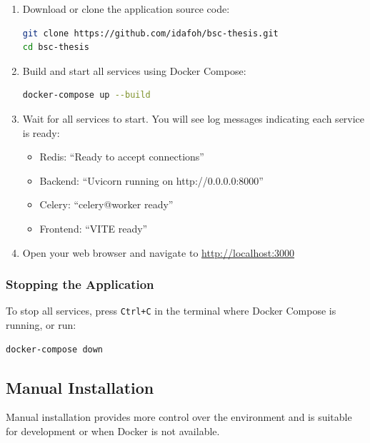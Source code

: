 \begin{enumerate}
    \item Download or clone the application source code:
\begin{lstlisting}[language=bash, caption={Clone the repository}]
git clone https://github.com/idafoh/bsc-thesis.git
cd bsc-thesis
\end{lstlisting}

    \item Build and start all services using Docker Compose:
\begin{lstlisting}[language=bash, caption={Start the application with Docker Compose}]
docker-compose up --build
\end{lstlisting}

    \item Wait for all services to start. You will see log messages indicating each service is ready:
    \begin{itemize}
        \item Redis: ``Ready to accept connections''
        \item Backend: ``Uvicorn running on http://0.0.0.0:8000''
        \item Celery: ``celery@worker ready''
        \item Frontend: ``VITE ready''
    \end{itemize}

    \item Open your web browser and navigate to \url{http://localhost:3000}
\end{enumerate}

\subsubsection{Stopping the Application}

To stop all services, press \texttt{Ctrl+C} in the terminal where Docker Compose is running, or run:
\begin{lstlisting}[language=bash, caption={Stop Docker containers}]
docker-compose down
\end{lstlisting}

\subsection{Manual Installation}

Manual installation provides more control over the environment and is suitable for development or when Docker is not available.

